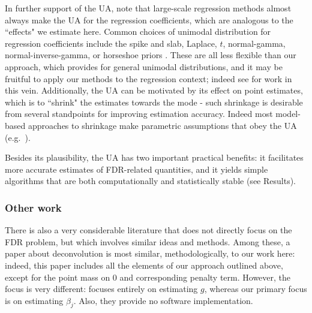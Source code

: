 \documentclass[11pt]{article}
\begin{document}

In further support of the UA, note that large-scale regression methods almost always make the UA for the regression coefficients,
which are analogous to the ``effects" we estimate here. 
Common choices of unimodal distribution for regression coefficients 
include the spike and slab, Laplace, $t$, normal-gamma, normal-inverse-gamma, or horseshoe priors \cite{carvalho2010horseshoe}.
These are all less flexible than our approach, which provides for general unimodal distributions, and 
it may be fruitful to apply our methods to the regression context; indeed see \cite{moser:2015} for work in this vein. 
Additionally, the UA can be motivated by its effect on point estimates, which is to ``shrink" the estimates towards the mode - such shrinkage is desirable from several standpoints for improving estimation accuracy. Indeed most model-based approaches to shrinkage
make parametric assumptions that obey the UA (e.g.~\cite{johnstone2004needles}).

Besides its plausibility, the UA has two important practical benefits: it facilitates more accurate estimates
of FDR-related quantities, and it yields simple algorithms that are both computationally
and statistically stable (see Results).

\subsubsection*{Other work}

There is also a very considerable literature that does not directly focus on the FDR problem, but which involves similar ideas and methods. 
 Among these, a paper about deconvolution \cite{cordy1997deconvolution} is most similar, methodologically, to our work here:
indeed, this paper includes all the elements of our approach outlined above, except for the point mass on 0 and corresponding penalty term.
However, the focus is very different: \cite{cordy1997deconvolution} focuses entirely on estimating $g$, whereas our primary focus is on estimating $\beta_j$.
Also, they provide no software implementation.  
\end{document}

